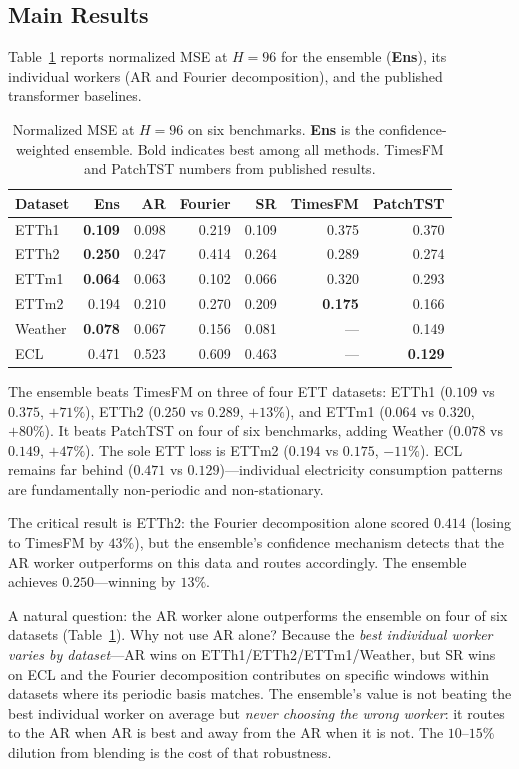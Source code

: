 \documentclass[sigconf,nonacm]{acmart}
\begin{document}
\subsection{Main Results}

Table~\ref{tab:main} reports normalized MSE at $H=96$ for the ensemble (\textbf{Ens}), its individual workers (AR and Fourier decomposition), and the published transformer baselines.

\begin{table}[t]
\caption{Normalized MSE at $H=96$ on six benchmarks. \textbf{Ens} is the confidence-weighted ensemble. Bold indicates best among all methods. TimesFM and PatchTST numbers from published results.}
\label{tab:main}
\centering
\small
\begin{tabular}{l rrrr rr}
\toprule
Dataset & \textbf{Ens} & AR & Fourier & SR & TimesFM & PatchTST \\
\midrule
ETTh1   & \textbf{0.109} & 0.098 & 0.219 & 0.109 & 0.375 & 0.370 \\
ETTh2   & \textbf{0.250} & 0.247 & 0.414 & 0.264 & 0.289 & 0.274 \\
ETTm1   & \textbf{0.064} & 0.063 & 0.102 & 0.066 & 0.320 & 0.293 \\
ETTm2   & 0.194 & 0.210 & 0.270 & 0.209 & \textbf{0.175} & 0.166 \\
Weather & \textbf{0.078} & 0.067 & 0.156 & 0.081 & --- & 0.149 \\
ECL     & 0.471 & 0.523 & 0.609 & 0.463 & --- & \textbf{0.129} \\
\bottomrule
\end{tabular}
\end{table}

The ensemble beats TimesFM on three of four ETT datasets: ETTh1 ($0.109$ vs $0.375$, $+71\%$), ETTh2 ($0.250$ vs $0.289$, $+13\%$), and ETTm1 ($0.064$ vs $0.320$, $+80\%$). It beats PatchTST on four of six benchmarks, adding Weather ($0.078$ vs $0.149$, $+47\%$). The sole ETT loss is ETTm2 ($0.194$ vs $0.175$, $-11\%$). ECL remains far behind ($0.471$ vs $0.129$)---individual electricity consumption patterns are fundamentally non-periodic and non-stationary.

The critical result is ETTh2: the Fourier decomposition alone scored $0.414$ (losing to TimesFM by $43\%$), but the ensemble's confidence mechanism detects that the AR worker outperforms on this data and routes accordingly. The ensemble achieves $0.250$---winning by $13\%$.

A natural question: the AR worker alone outperforms the ensemble on four of six datasets (Table~\ref{tab:main}). Why not use AR alone? Because the \emph{best individual worker varies by dataset}---AR wins on ETTh1/ETTh2/ETTm1/Weather, but SR wins on ECL and the Fourier decomposition contributes on specific windows within datasets where its periodic basis matches. The ensemble's value is not beating the best individual worker on average but \emph{never choosing the wrong worker}: it routes to the AR when AR is best and away from the AR when it is not. The $10$--$15\%$ dilution from blending is the cost of that robustness.
\end{document}
